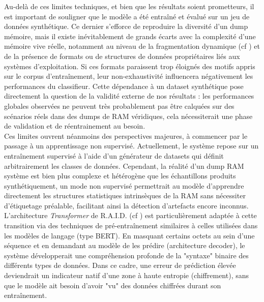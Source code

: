 \documentclass[12pt]{report}
\begin{document}
    Au-delà de ces limites techniques, et bien que les résultats soient prometteurs, il est important de souligner que le modèle a été entraîné et évalué sur un jeu de données synthétique. Ce dernier s'efforce de reproduire la diversité d'un dump mémoire, mais il existe inévitablement de grands écarts avec la complexité d'une mémoire vive réelle, notamment au niveau de la fragmentation dynamique (cf ) et de la présence de formats ou de structures de données propriétaires liés aux systèmes d'exploitation. Si ces formats paraissent trop éloignés des motifs appris sur le corpus d'entraînement, leur non-exhaustivité influencera négativement les performances du classifieur. Cette dépendance à un dataset synthétique pose directement la question de la validité externe de nos résultats : les performances globales observées ne peuvent très probablement pas être calquées sur des scénarios réels dans des dumps de RAM véridiques, cela nécessiterait une phase de validation et de réentrainement au besoin.\\

    Ces limites ouvrent néanmoins des perspectives majeures, à commencer par le passage à un apprentissage non supervisé. Actuellement, le système repose sur un entraînement supervisé à l'aide d'un générateur de datasets qui définit arbitrairement les classes de données. Cependant, la réalité d'un dump RAM système est bien plus complexe et hétérogène que les échantillons produits synthétiquement, un mode non supervisé permettrait au modèle d'apprendre directement les structures statistiques intrinsèques de la RAM sans nécessiter d'étiquetage préalable, facilitant ainsi la détection d'artefacts encore inconnus.\\

    L'architecture \textit{Transformer} de R.A.I.D. (cf ) est particulièrement adaptée à cette transition via des techniques de pré-entraînement similaires à celles utilisées dans les modèles de langage (type BERT). En masquant certains octets au sein d'une séquence et en demandant au modèle de les prédire (architecture decoder), le système développerait une compréhension profonde de la "syntaxe" binaire des différents types de données. Dans ce cadre, une erreur de prédiction élevée deviendrait un indicateur natif d'une zone à haute entropie (chiffrement), sans que le modèle ait besoin d'avoir "vu" des données chiffrées durant son entraînement.\\
\end{document}
